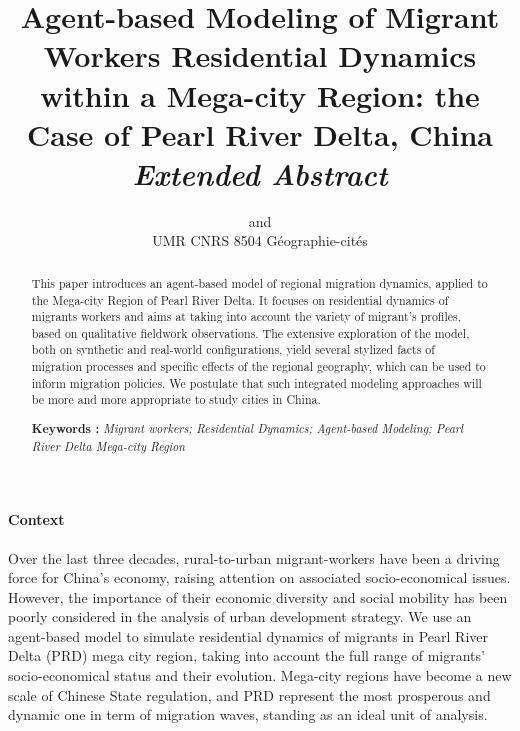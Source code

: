 

\def \draft {0}



\title{Agent-based Modeling of Migrant Workers Residential Dynamics within a Mega-city Region: the Case of Pearl River Delta, China\\\medskip
\textit{Extended Abstract}
}
\author{ and \\
UMR CNRS 8504 Géographie-cités
}
\date{}




\maketitle

\justify


\begin{abstract}
This paper introduces an agent-based model of regional migration dynamics, applied to the Mega-city Region of Pearl River Delta. It focuses on residential dynamics of migrants workers and aims at taking into account the variety of migrant's profiles, based on qualitative fieldwork observations. The extensive exploration of the model, both on synthetic and real-world configurations, yield several stylized facts of migration processes and specific effects of the regional geography, which can be used to inform migration policies. We postulate that such integrated modeling approaches will be more and more appropriate to study cities in China.

\bigskip

\noindent\textbf{Keywords : } \textit{Migrant workers; Residential Dynamics; Agent-based Modeling; Pearl River Delta Mega-city Region}
\end{abstract}





\paragraph{Context}

Over the last three decades, rural-to-urban migrant-workers have been a driving force for China's economy, raising attention on associated socio-economical issues. However, the importance of their economic diversity and social mobility has been poorly considered in the analysis of urban development strategy.
We use an agent-based model to simulate residential dynamics of migrants in Pearl River Delta (PRD) mega city region, taking into account the full range of migrants’ socio-economical status and their evolution. Mega-city regions have become a new scale of Chinese State regulation, and PRD represent the most prosperous and dynamic one in term of migration waves, standing as an ideal unit of analysis.

